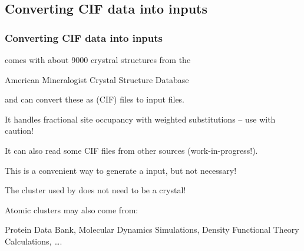 \subsection{ Converting CIF data into {\feff} inputs}
\begin{frame}[fragile] \frametitle{Converting CIF data into {\feff} inputs}

\begin{cenpage}{125mm}

  {\larch} comes with about 9000 crystral structures from the


  \begin{cenpage}{75mm}
    American Mineralogist Crystal Structure Database
  \end{cenpage}


  and can convert these as {}
  (CIF) files to {\feff} input files.

  \vmm
  It handles fractional site occupancy with weighted substitutions -- use
  with caution!

  \vmm
  It can also read some CIF files from other sources (work-in-progress!).

  \vmm
  This is a convenient way to generate a {\feff} input, but not necessary!

\begin{postitbox}{84mm}
  The cluster used by {\feff} does not need to be a crystal!
\end{postitbox}

\vmm
Atomic clusters may also come from:

\vmm
Protein Data Bank, Molecular Dynamics Simulations,
Density Functional Theory Calculations, \ldots.


\end{cenpage}
\end{frame}


